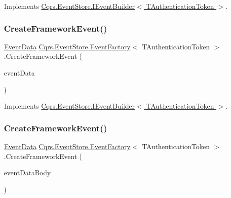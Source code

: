 Implements \hyperlink{interfaceCqrs_1_1EventStore_1_1IEventBuilder_ab9608f44e12ce029fc98ad0eee53516a_ab9608f44e12ce029fc98ad0eee53516a}{Cqrs.\+Event\+Store.\+I\+Event\+Builder$<$ T\+Authentication\+Token $>$}.

\mbox{\label{classCqrs_1_1EventStore_1_1EventFactory_ae514998a8368283f882014cc0db5b2b2_ae514998a8368283f882014cc0db5b2b2}} 
\subsubsection{\texorpdfstring{Create\+Framework\+Event()}{CreateFrameworkEvent()}\hspace{0.1cm}{\footnotesize\ttfamily [2/4]}}
{\footnotesize\ttfamily \hyperlink{classCqrs_1_1Events_1_1EventData}{Event\+Data} \hyperlink{classCqrs_1_1EventStore_1_1EventFactory}{Cqrs.\+Event\+Store.\+Event\+Factory}$<$ T\+Authentication\+Token $>$.Create\+Framework\+Event (\begin{DoxyParamCaption}\item[{\hyperlink{interfaceCqrs_1_1Events_1_1IEvent}{I\+Event}$<$ T\+Authentication\+Token $>$}]{event\+Data }\end{DoxyParamCaption})}



Implements \hyperlink{interfaceCqrs_1_1EventStore_1_1IEventBuilder_a8ee9560f7b53c67b9946c3b0719eca96_a8ee9560f7b53c67b9946c3b0719eca96}{Cqrs.\+Event\+Store.\+I\+Event\+Builder$<$ T\+Authentication\+Token $>$}.

\mbox{\label{classCqrs_1_1EventStore_1_1EventFactory_adbcf9f3c67cfef3fe894e5fb53e8b800_adbcf9f3c67cfef3fe894e5fb53e8b800}} 
\subsubsection{\texorpdfstring{Create\+Framework\+Event()}{CreateFrameworkEvent()}\hspace{0.1cm}{\footnotesize\ttfamily [3/4]}}
{\footnotesize\ttfamily \hyperlink{classCqrs_1_1Events_1_1EventData}{Event\+Data} \hyperlink{classCqrs_1_1EventStore_1_1EventFactory}{Cqrs.\+Event\+Store.\+Event\+Factory}$<$ T\+Authentication\+Token $>$.Create\+Framework\+Event (\begin{DoxyParamCaption}\item[{string}]{event\+Data\+Body }\end{DoxyParamCaption})}



